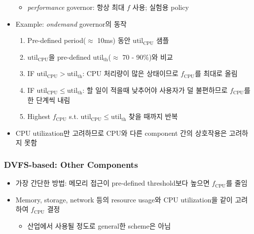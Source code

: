 \begin{itemize}
\begin{itemize}
        \item \textit{performance} governor: 항상 최대 $f$ 사용; 실험용 policy
    \end{itemize}
    \item Example: \textit{ondemand} governor의 동작
    \begin{enumerate}
        \item Pre-defined period($\approx$ 10ms) 동안 $\mathrm{util_{CPU}}$ 샘플
        \item $\mathrm{util_{CPU}}$을 pre-defined $\mathrm{util_{th}}$($\approx$ 70 - 90\%)와 비교
        \item IF $\mathrm{util_{CPU}}>\mathrm{util_{th}}$: CPU 처리량이 많은 상태이므로 $f_{\mathrm{CPU}}$를 최대로 올림
        \item IF $\mathrm{util_{CPU}}\leq\mathrm{util_{th}}$: 할 일이 적을때 낮추어야 사용자가 덜 불편하므로 $f_{\mathrm{CPU}}$를 한 단계씩 내림
        \item Highest $f_{\mathrm{CPU}}$ s.t. $\mathrm{util_{CPU}}\leq\mathrm{util_{th}}$ 찾을 때까지 반복
    \end{enumerate}
    \item CPU utilization만 고려하므로 CPU와 다른 component 간의 상호작용은 고려하지 못함
\end{itemize}

\subsubsection*{DVFS-based: Other Components}
\begin{itemize}
    \item 가장 간단한 방법: 메모리 접근이 pre-defined threshold보다 높으면 $f_{\mathrm{CPU}}$를 줄임
    \item Memory, storage, network 등의 resource usage와 CPU utilization을 같이 고려하여 $f_{\mathrm{CPU}}$ 결정
    \begin{itemize}
        \item 산업에서 사용될 정도로 general한 scheme은 아님
    \end{itemize}
\end{itemize}

